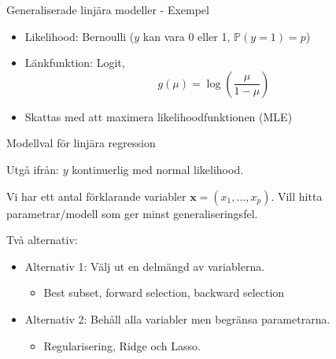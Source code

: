 \documentclass[10pt,english]{beamer}
\begin{document}
\begin{frame}{Generaliserade linjära modeller - Exempel}
    \begin{itemize}
        \item Likelihood: Bernoulli ($y$ kan vara 0 eller 1, $\mathbb{P}(y = 1) = p$)
        \item L\"ankfunktion: Logit,
        \begin{equation*}
            g(\mu) = \log\left( \frac{\mu}{1-\mu} \right)
        \end{equation*}
        \item Skattas med att maximera likelihoodfunktionen (MLE)
    \end{itemize}
\end{frame}


\begin{frame}{Modellval för linjära regression}

    Utgå ifrån: $y$ kontinuerlig med normal likelihood.

    Vi har ett antal förklarande variabler $\mathbf{x} = (x_1, \ldots, x_p)$. Vill hitta parametrar/modell som ger minst generaliseringsfel.

    Två alternativ:
    \begin{itemize}
        \item Alternativ 1: Välj ut en delmängd av variablerna.
        \begin{itemize}
            \item Best subset, forward selection, backward selection
        \end{itemize}
        \item Alternativ 2: Behåll alla variabler men begränsa parametrarna.
        \begin{itemize}
            \item Regularisering, Ridge och Lasso.
        \end{itemize}  
    \end{itemize}
    
\end{frame}
\end{document}

